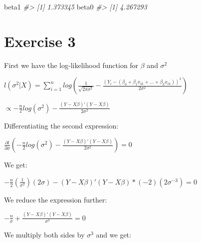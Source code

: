\documentclass[]{article}
\newenvironment{Shaded}{\begin{snugshade}}{\end{snugshade}}
\newcommand{\CommentTok}[1]{\textcolor[rgb]{0.56,0.35,0.01}{\textit{#1}}}
\newcommand{\KeywordTok}[1]{\textcolor[rgb]{0.13,0.29,0.53}{\textbf{#1}}}
\newcommand{\NormalTok}[1]{#1}
\newcommand{\OperatorTok}[1]{\textcolor[rgb]{0.81,0.36,0.00}{\textbf{#1}}}
\newcommand{\StringTok}[1]{\textcolor[rgb]{0.31,0.60,0.02}{#1}}
\begin{document}
\begin{Shaded}
\end{Shaded}

\begin{Shaded}
\begin{Highlighting}[]
\NormalTok{beta1}
\CommentTok{#> [1] 1.373345}
\NormalTok{beta0}
\CommentTok{#> [1] 4.267293}
\end{Highlighting}
\end{Shaded}

\newpage

\hypertarget{exercise-3}{%
\section{Exercise 3}\label{exercise-3}}

First we have the log-likelihood function for \(\beta\) and
\(\sigma^{2}\)

\(l(\sigma^{2} | X) = \sum_{i=1}^n log(\frac{1}{\sqrt{2 \pi \sigma^{2}}} - \frac{(Y_{i} - (\beta_{0} + \beta_{1} x_{ik} + \dots + \beta_{k} x_{ik}))^{2}}{2 \sigma^{2}})\)

\(\propto - \frac{n}{2} log(\sigma^{2}) - \frac{(Y - X \beta) \prime (Y - X \beta)}{2 \sigma^{2}}\)

Differentiating the second expression:

\(\frac{\partial l}{\partial \sigma} ( - \frac{n}{2} log(\sigma^{2}) - \frac{(Y - X \beta) \prime (Y - X \beta)}{2 \sigma^{2}}) = 0\)

We get:

\(- \frac{n}{2} (\frac{1}{ \sigma^{2}} ) (2 \sigma) - (Y - X \beta) \prime (Y - X \beta) * (-2)(2 \sigma^{-3}) = 0\)

We reduce the expression further:

\(- \frac{n}{\sigma} + \frac{(Y - X \beta) \prime (Y - X \beta)}{\sigma^{3}} = 0\)

We multiply both sides by \(\sigma^{3}\) and we get:
\end{document}
